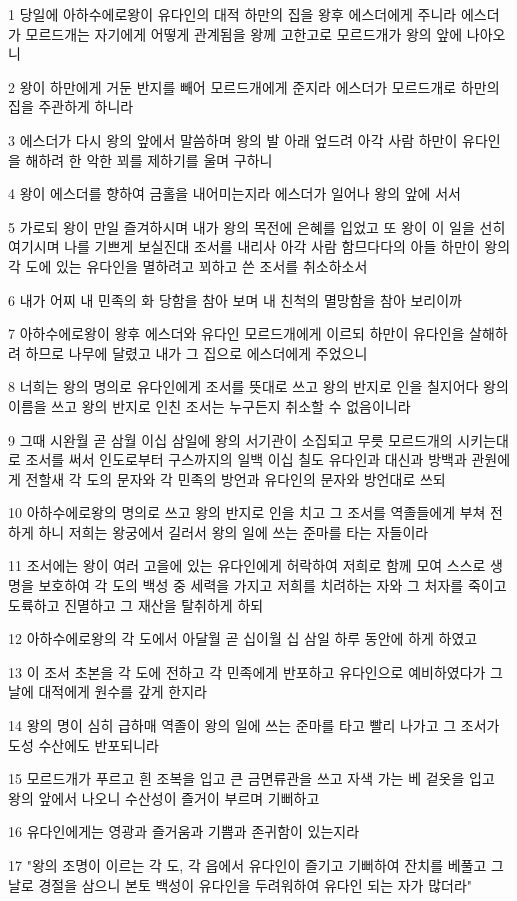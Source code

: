\par 1 당일에 아하수에로왕이 유다인의 대적 하만의 집을 왕후 에스더에게 주니라 에스더가 모르드개는 자기에게 어떻게 관계됨을 왕께 고한고로 모르드개가 왕의 앞에 나아오니
\par 2 왕이 하만에게 거둔 반지를 빼어 모르드개에게 준지라 에스더가 모르드개로 하만의 집을 주관하게 하니라
\par 3 에스더가 다시 왕의 앞에서 말씀하며 왕의 발 아래 엎드려 아각 사람 하만이 유다인을 해하려 한 악한 꾀를 제하기를 울며 구하니
\par 4 왕이 에스더를 향하여 금홀을 내어미는지라 에스더가 일어나 왕의 앞에 서서
\par 5 가로되 왕이 만일 즐겨하시며 내가 왕의 목전에 은혜를 입었고 또 왕이 이 일을 선히 여기시며 나를 기쁘게 보실진대 조서를 내리사 아각 사람 함므다다의 아들 하만이 왕의 각 도에 있는 유다인을 멸하려고 꾀하고 쓴 조서를 취소하소서
\par 6 내가 어찌 내 민족의 화 당함을 참아 보며 내 친척의 멸망함을 참아 보리이까
\par 7 아하수에로왕이 왕후 에스더와 유다인 모르드개에게 이르되 하만이 유다인을 살해하려 하므로 나무에 달렸고 내가 그 집으로 에스더에게 주었으니
\par 8 너희는 왕의 명의로 유다인에게 조서를 뜻대로 쓰고 왕의 반지로 인을 칠지어다 왕의 이름을 쓰고 왕의 반지로 인친 조서는 누구든지 취소할 수 없음이니라
\par 9 그때 시완월 곧 삼월 이십 삼일에 왕의 서기관이 소집되고 무릇 모르드개의 시키는대로 조서를 써서 인도로부터 구스까지의 일백 이십 칠도 유다인과 대신과 방백과 관원에게 전할새 각 도의 문자와 각 민족의 방언과 유다인의 문자와 방언대로 쓰되
\par 10 아하수에로왕의 명의로 쓰고 왕의 반지로 인을 치고 그 조서를 역졸들에게 부쳐 전하게 하니 저희는 왕궁에서 길러서 왕의 일에 쓰는 준마를 타는 자들이라
\par 11 조서에는 왕이 여러 고을에 있는 유다인에게 허락하여 저희로 함께 모여 스스로 생명을 보호하여 각 도의 백성 중 세력을 가지고 저희를 치려하는 자와 그 처자를 죽이고 도륙하고 진멸하고 그 재산을 탈취하게 하되
\par 12 아하수에로왕의 각 도에서 아달월 곧 십이월 십 삼일 하루 동안에 하게 하였고
\par 13 이 조서 초본을 각 도에 전하고 각 민족에게 반포하고 유다인으로 예비하였다가 그 날에 대적에게 원수를 갚게 한지라
\par 14 왕의 명이 심히 급하매 역졸이 왕의 일에 쓰는 준마를 타고 빨리 나가고 그 조서가 도성 수산에도 반포되니라
\par 15 모르드개가 푸르고 흰 조복을 입고 큰 금면류관을 쓰고 자색 가는 베 겉옷을 입고 왕의 앞에서 나오니 수산성이 즐거이 부르며 기뻐하고
\par 16 유다인에게는 영광과 즐거움과 기쁨과 존귀함이 있는지라
\par 17 "왕의 조명이 이르는 각 도, 각 읍에서 유다인이 즐기고 기뻐하여 잔치를 베풀고 그 날로 경절을 삼으니 본토 백성이 유다인을 두려워하여 유다인 되는 자가 많더라"

